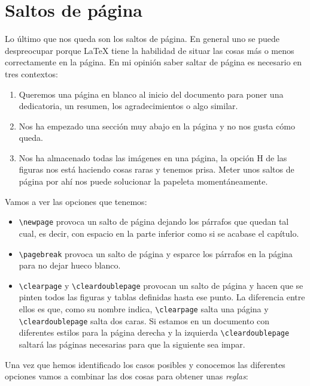 \section{Saltos de página}

Lo último que nos queda son los saltos de página. En general uno se
puede despreocupar porque LaTeX tiene la habilidad de situar las cosas
más o menos correctamente en la página. En mi opinión saber saltar de
página es necesario en tres contextos:

\begin{enumerate}
\def\labelenumi{\arabic{enumi}.}
\item
  Queremos una página en blanco al inicio del documento para poner una
  dedicatoria, un resumen, los agradecimientos o algo similar.
\item
  Nos ha empezado una sección muy abajo en la página y no nos gusta cómo
  queda.
\item
  Nos ha almacenado todas las imágenes en una página, la opción H de las
  figuras nos está haciendo cosas raras y tenemos prisa. Meter unos
  saltos de página por ahí nos puede solucionar la papeleta
  momentáneamente.
\end{enumerate}

Vamos a ver las opciones que tenemos:

\begin{itemize}
\item
  \lstinline!\newpage! provoca un salto de página dejando los párrafos
  que quedan tal cual, es decir, con espacio en la parte inferior como
  si se acabase el capítulo.
\item
  \lstinline!\pagebreak! provoca un salto de página y esparce los
  párrafos en la página para no dejar hueco blanco.
\item
  \lstinline!\clearpage! y \lstinline!\cleardoublepage! provocan un
  salto de página y hacen que se pinten todos las figuras y tablas
  definidas hasta ese punto. La diferencia entre ellos es que, como su
  nombre indica, \lstinline!\clearpage! salta una página y
  \lstinline!\cleardoublepage! salta dos caras. Si estamos en un
  documento con diferentes estilos para la página derecha y la izquierda
  \lstinline!\cleardoublepage! saltará las páginas necesarias para que
  la siguiente sea impar.
\end{itemize}

Una vez que hemos identificado los casos posibles y conocemos las
diferentes opciones vamos a combinar las dos cosas para obtener unas
\emph{reglas}:

